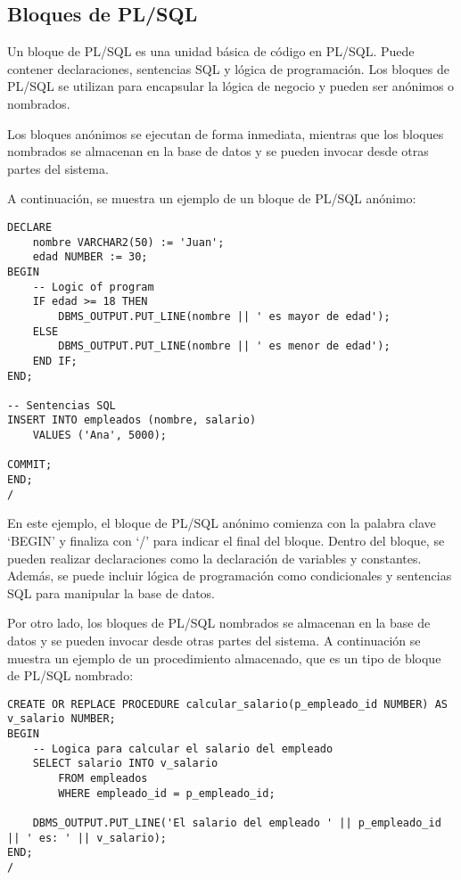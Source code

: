 \documentclass[executivepaper]{article}
\begin{document}
\subsection{Bloques de PL/SQL}
Un bloque de PL/SQL es una unidad básica de código en PL/SQL. Puede contener declaraciones, sentencias SQL y lógica de programación. Los bloques de PL/SQL se utilizan para encapsular la lógica de negocio y pueden ser anónimos o nombrados.

Los bloques anónimos se ejecutan de forma inmediata, mientras que los bloques nombrados se almacenan en la base de datos y se pueden invocar desde otras partes del sistema.

A continuación, se muestra un ejemplo de un bloque de PL/SQL anónimo:

\begin{lstlisting}
DECLARE
    nombre VARCHAR2(50) := 'Juan';
    edad NUMBER := 30;
BEGIN
    -- Logic of program
    IF edad >= 18 THEN
        DBMS_OUTPUT.PUT_LINE(nombre || ' es mayor de edad');
    ELSE
        DBMS_OUTPUT.PUT_LINE(nombre || ' es menor de edad');
    END IF;
END;

-- Sentencias SQL
INSERT INTO empleados (nombre, salario)
    VALUES ('Ana', 5000);

COMMIT;
END;
/
\end{lstlisting}

En este ejemplo, el bloque de PL/SQL anónimo comienza con la palabra clave \enquote*{BEGIN} y finaliza con \enquote*{/} para indicar el final del bloque. Dentro del bloque, se pueden realizar declaraciones como la declaración de variables y constantes. Además, se puede incluir lógica de programación como condicionales y sentencias SQL para manipular la base de datos.

Por otro lado, los bloques de PL/SQL nombrados se almacenan en la base de datos y se pueden invocar desde otras partes del sistema. A continuación se muestra un ejemplo de un procedimiento almacenado, que es un tipo de bloque de PL/SQL nombrado:

\begin{lstlisting}
CREATE OR REPLACE PROCEDURE calcular_salario(p_empleado_id NUMBER) AS
v_salario NUMBER;
BEGIN
    -- Logica para calcular el salario del empleado
    SELECT salario INTO v_salario
        FROM empleados
        WHERE empleado_id = p_empleado_id;

    DBMS_OUTPUT.PUT_LINE('El salario del empleado ' || p_empleado_id || ' es: ' || v_salario);
END;
/
\end{lstlisting}
\end{document}
